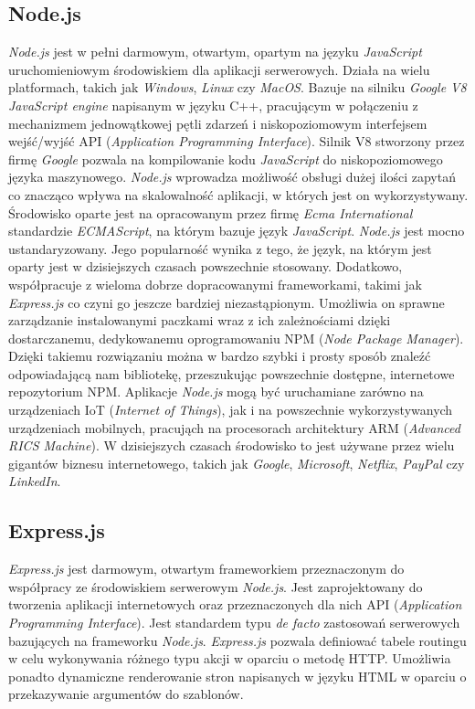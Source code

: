 \subsection{Node.js}
\textit{Node.js} jest w pełni darmowym, otwartym, opartym na języku \textit{JavaScript} uruchomieniowym środowiskiem dla aplikacji serwerowych. Działa na wielu platformach, takich jak \textit{Windows}, \textit{Linux} czy \textit{MacOS}. Bazuje na silniku \textit{Google V8 JavaScript engine} napisanym w języku C++, pracującym w połączeniu z mechanizmem jednowątkowej pętli zdarzeń i niskopoziomowym interfejsem wejść/wyjść API (\textit{Application Programming Interface}). Silnik V8 stworzony przez firmę \textit{Google} pozwala na kompilowanie kodu \textit{JavaScript} do niskopoziomowego języka maszynowego. \textit{Node.js} wprowadza możliwość obsługi dużej ilości zapytań co znacząco wpływa na skalowalność aplikacji, w których jest on wykorzystywany. Środowisko oparte jest na opracowanym przez firmę \textit{Ecma International} standardzie \textit{ECMAScript}, na którym bazuje język \textit{JavaScript}. \textit{Node.js} jest mocno ustandaryzowany. Jego popularność wynika z tego, że język, na którym jest oparty jest w dzisiejszych czasach powszechnie stosowany. Dodatkowo, współpracuje z wieloma dobrze dopracowanymi frameworkami, takimi jak \textit{Express.js} co czyni go jeszcze bardziej niezastąpionym. Umożliwia on sprawne zarządzanie instalowanymi paczkami wraz z ich zależnościami dzięki dostarczanemu, dedykowanemu oprogramowaniu NPM (\textit{Node Package Manager}). Dzięki takiemu rozwiązaniu można w bardzo szybki i prosty sposób znaleźć odpowiadającą nam bibliotekę, przeszukując powszechnie dostępne, internetowe repozytorium NPM. Aplikacje \textit{Node.js} mogą być uruchamiane zarówno na urządzeniach IoT (\textit{Internet of Things}), jak i na powszechnie wykorzystywanych urządzeniach mobilnych, pracująch na procesorach architektury ARM (\textit{Advanced RICS Machine}). W dzisiejszych czasach środowisko to jest używane przez wielu gigantów biznesu internetowego, takich jak \textit{Google}, \textit{Microsoft}, \textit{Netflix}, \textit{PayPal} czy \textit{LinkedIn}. \cite{Node}

\subsection{Express.js}
\textit{Express.js} jest darmowym, otwartym frameworkiem przeznaczonym do współpracy ze środowiskiem serwerowym \textit{Node.js}. Jest zaprojektowany do tworzenia aplikacji internetowych oraz przeznaczonych dla nich API (\textit{Application Programming Interface}). Jest standardem typu \textit{de facto} zastosowań serwerowych bazujących na frameworku \textit{Node.js}. \textit{Express.js} pozwala definiować tabele routingu w celu wykonywania różnego typu akcji w oparciu o metodę HTTP. Umożliwia ponadto dynamiczne renderowanie stron napisanych w języku HTML w oparciu o przekazywanie argumentów do szablonów. \cite{Express}

